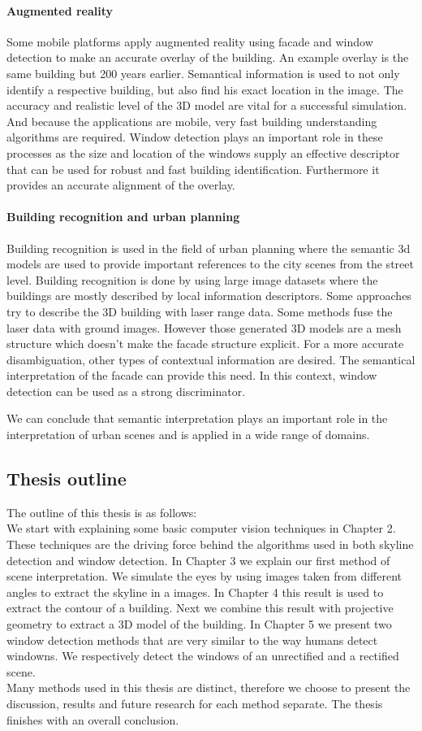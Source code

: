 \paragraph{Augmented reality}
	Some mobile platforms apply augmented reality using facade and window
	detection to make an accurate overlay of the building. An example overlay is
	the same building but 200 years earlier.  Semantical information is used to
	not only identify a respective building, but also find his exact location in
	the image.  The accuracy and realistic level of the 3D model are vital for a
	successful simulation.  And because the applications are mobile, very fast
	building understanding algorithms are required.  Window detection plays an
	important role in these processes as the size and location of the windows
	supply an effective descriptor that can be used for robust and fast building
	identification.  Furthermore it provides an accurate alignment of the
	overlay.

\paragraph{Building recognition and urban planning}
	Building recognition is used in the field of urban planning where the
	semantic 3d models are used to provide important references to the city
	scenes from the street level.  Building recognition is done by using large
	image datasets where the buildings are mostly described by local information
	descriptors.  Some approaches try to describe the 3D building with laser
	range data. Some methods fuse the laser data with ground images. However
	those generated 3D models are a mesh structure which doesn't make the facade
	structure explicit.  For a more accurate disambiguation, other types of
	contextual information are desired.  The semantical interpretation of the
	facade can provide this need.  In this context, window detection can be used
	as a strong discriminator.

We can conclude that semantic interpretation plays an important role in the
interpretation of urban scenes and is applied in a wide range of domains.  

\subsection{Thesis outline}
The outline of this thesis is as follows:\\ We start with explaining some basic
computer vision techniques in Chapter 2.  These techniques are the driving force
behind the algorithms used in both skyline detection and window detection.  In
Chapter 3 we explain our first method of scene interpretation.  We simulate the
eyes by using images taken from different angles to extract the skyline in a
images.  In Chapter 4 this result is used to extract the contour of a building.
Next we combine this result with projective geometry to extract a 3D model of
the building.  In Chapter 5 we present two window detection methods that are
very similar to the way humans detect windowns. We respectively detect the
windows of an unrectified and a rectified scene.\\  

Many methods used in this thesis are distinct, therefore we
choose to present the discussion, results and future research for each method
separate.  The thesis finishes with an overall conclusion.




